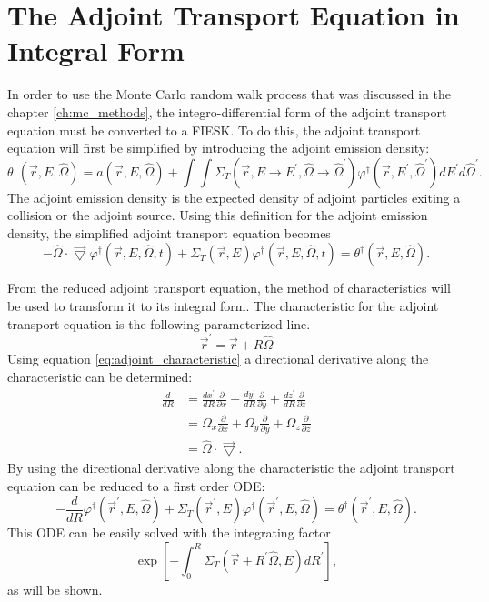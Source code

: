 \section{The Adjoint Transport Equation in Integral Form}
In order to use the Monte Carlo random walk process that was discussed
in the chapter \ref{ch:mc_methods}, the integro-differential form of the adjoint
transport equation must be converted to a FIESK. To do this, the adjoint
transport equation will first be simplified by introducing the adjoint emission
density: 
\begin{equation}
  \theta^{\dagger}(\vec{r},E,\hat{\Omega}) = a(\vec{r},E,\hat{\Omega}) +
  \int\int \Sigma_T(\vec{r},E \to E^{'},\hat{\Omega} \to \hat{\Omega}^{'})
  \varphi^{\dagger}(\vec{r},E^{'},\hat{\Omega}^{'}) dE^{'}d\hat{\Omega}^{'}.
  \label{eq:adjoint_emission_density}
\end{equation}
The adjoint emission density is the expected density of adjoint particles 
exiting a collision or the adjoint source. Using this definition for the
adjoint emission density, the simplified adjoint transport equation becomes
\begin{equation}
  -\hat{\Omega} \cdot \vec{\bigtriangledown} 
    \varphi^{\dagger}(\vec{r},E,\hat{\Omega},t)
    + \Sigma_T(\vec{r},E) \varphi^{\dagger}(\vec{r},E,\hat{\Omega},t) =
    \theta^{\dagger}(\vec{r},E,\hat{\Omega}).
\end{equation}
  
From the reduced adjoint transport equation, the method of characteristics will
be used to transform it to its integral form. The characteristic for the 
adjoint transport equation is the following parameterized line.
\begin{equation}
  \vec{r}^{'} = \vec{r} + R\hat{\Omega}
  \label{eq:adjoint_characteristic}
\end{equation}
Using equation \ref{eq:adjoint_characteristic} a directional derivative along
the characteristic can be determined:
\begin{align}
  \frac{d}{dR} & = \frac{dx^{'}}{dR}\frac{\partial}{\partial x} +
  \frac{dy^{'}}{dR}\frac{\partial}{\partial y} +
  \frac{dz^{'}}{dR}\frac{\partial}{\partial z} \nonumber \\
  & = \Omega_x \frac{\partial}{\partial x} +
  \Omega_y \frac{\partial}{\partial y} +
  \Omega_z \frac{\partial}{\partial z} \nonumber \\
  & = \hat{\Omega} \cdot \vec{\bigtriangledown}.
\end{align}
By using the directional derivative along the characteristic the adjoint 
transport equation can be reduced to a first order ODE:
\begin{equation}
  -\frac{d}{dR}\varphi^{\dagger}(\vec{r}^{'},E,\hat{\Omega}) + 
  \Sigma_T(\vec{r}^{'},E)
  \varphi^{\dagger}(\vec{r}^{'},E,\hat{\Omega}) = 
  \theta^{\dagger}(\vec{r}^{'},E,\hat{\Omega}).
  \label{eq:adjoint_transport_ode}
\end{equation}
This ODE can be easily solved with the integrating factor
\begin{equation} 
  \exp{\left[-\int_0^R \Sigma_T(\vec{r}+R^{'}\hat{\Omega},E)dR^{'} \right]},
\end{equation}
as will be shown.

